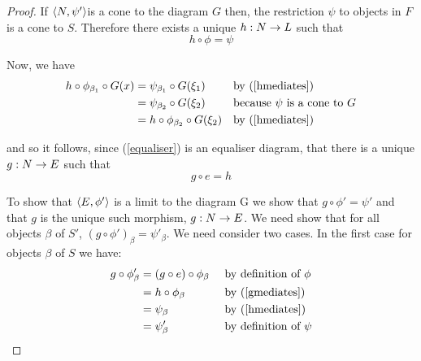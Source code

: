 \documentclass[10pt,a4paper]{scrartcl}
\begin{document}
\begin{proof}
If $\left\langle N,\psi'\right\rangle$is a cone to the diagram $G$ then, the restriction $\psi$ to objects in $F$ is a cone to  $S$. Therefore there exists a unique $h : N \rightarrow L$ such that 
\begin{equation}
\label{hmediates}
h \circ \phi = \psi
\end{equation}

\noindent
Now, we have 
\begin{align*}
h \circ \phi_{\beta_1} \circ G(x)
             & = \psi_{\beta_1} \circ G(\xi_1)         && \mbox{by (\ref{hmediates})}\\
             & = \psi_{\beta_2} \circ G(\xi_2)         && \mbox{because } \psi \mbox{ is a cone to } G \\
             & = h \circ \phi_{\beta_2} \circ G(\xi_2) && \mbox{by (\ref{hmediates}) }\\
\end{align*}

\noindent
and so it follows, since (\ref{equaliser}) is an equaliser diagram,
that there is a unique $g: N \rightarrow E$ such that 
\begin{equation}
\label{gmediates}
g \circ e = h
\end{equation}

\noindent
To show that $\left\langle E,\phi'\right\rangle$ is a limit to the diagram G we show that 
$g \circ \phi' = \psi'$ and that $g$ is the unique such morphism,
$g: N \rightarrow E$.
\noindent
We need show that for all objects $\beta$ of $S'$,  $(g \circ \phi')_\beta =\psi'_\beta$. 
We need consider two cases. In the first case for objects $\beta$ of $S$ we have:
\begin{align*}
g \circ \phi'_\beta
             & = (g \circ e) \circ \phi_\beta   &&  \mbox{ by definition of } \phi\\
             & = h \circ \phi_\beta             && \mbox{ by (\ref{gmediates})}   \\
             & = \psi_\beta                     && \mbox{ by (\ref{hmediates})}   \\
						 & = \psi'_\beta                    && \mbox{ by definition of } \psi\\
\end{align*}


\end{proof}
\end{document}
